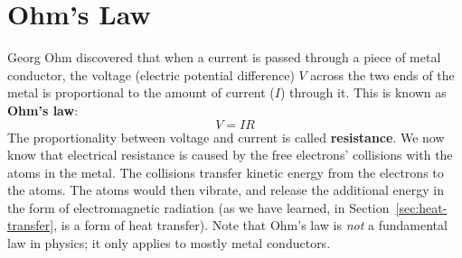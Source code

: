 \section{Ohm's Law}

Georg Ohm discovered that when a current is passed through a piece of metal
conductor, the voltage (electric potential difference) $V$ across the two ends
of the metal is proportional to the amount of current ($I$) through it. This is
known as \textbf{Ohm's law}:
\begin{equation}
  \boxed{
    V=IR
  }
\end{equation}
The proportionality between voltage and current is called \textbf{resistance}.
We now know that electrical resistance is caused by the free electrons'
collisions with the atoms in the metal. The collisions transfer kinetic energy
from the electrons to the atoms. The atoms would then vibrate, and release
the additional energy in the form of electromagnetic radiation (as we have
learned, in Section~\ref{sec:heat-transfer}, is a form of heat transfer).
Note that Ohm's law is \emph{not} a fundamental law in physics; it only applies
to mostly metal conductors.

